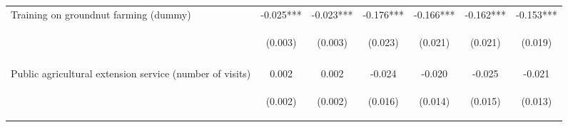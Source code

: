 \begin{center}
\begin{tabular}{lcccccc}
Training on groundnut farming (dummy) & -0.025*** & -0.023*** & -0.176*** & -0.166*** & -0.162*** & -0.153*** \\
 & \begin{footnotesize}(0.003)\end{footnotesize} & \begin{footnotesize}(0.003)\end{footnotesize} & \begin{footnotesize}(0.023)\end{footnotesize} & \begin{footnotesize}(0.021)\end{footnotesize} & \begin{footnotesize}(0.021)\end{footnotesize} & \begin{footnotesize}(0.019)\end{footnotesize} \\
\vspace{4pt} & \begin{footnotesize}[0.000]\end{footnotesize} & \begin{footnotesize}[0.000]\end{footnotesize} & \begin{footnotesize}[0.000]\end{footnotesize} & \begin{footnotesize}[0.000]\end{footnotesize} & \begin{footnotesize}[0.000]\end{footnotesize} & \begin{footnotesize}[0.000]\end{footnotesize} \\
Public agricultural extension service (number of visits) & 0.002 & 0.002 & -0.024 & -0.020 & -0.025 & -0.021 \\
 & \begin{footnotesize}(0.002)\end{footnotesize} & \begin{footnotesize}(0.002)\end{footnotesize} & \begin{footnotesize}(0.016)\end{footnotesize} & \begin{footnotesize}(0.014)\end{footnotesize} & \begin{footnotesize}(0.015)\end{footnotesize} & \begin{footnotesize}(0.013)\end{footnotesize} \\

\end{tabular}
\end{center}
